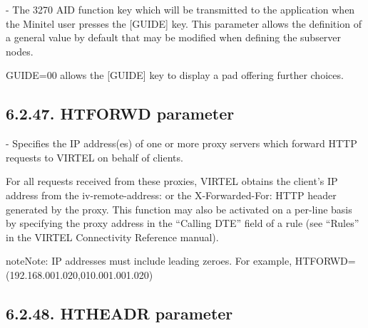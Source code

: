 \documentclass[letterpaper,10pt,english]{sphinxmanual}
\begin{document}
 - The 3270 AID function key which will be transmitted to the application when the Minitel user presses the {[}GUIDE{]} key. This parameter allows the definition of a general value by default that may be modified when defining the subserver nodes.

GUIDE=00 allows the {[}GUIDE{]} key to display a pad offering further choices.


\subsection{6.2.47. HTFORWD parameter}
\label{\detokenize{Installation_Guide:htforwd-parameter}}
\begin{sphinxVerbatim}[commandchars=\\\{\}]
        
\end{sphinxVerbatim}

 - Specifies the IP address(es) of one or more proxy servers which forward HTTP requests to VIRTEL on behalf of clients.

For all requests received from these proxies, VIRTEL obtains the client’s IP address from the iv-remote-address: or the X-Forwarded-For: HTTP header generated by the proxy. This function may also be activated on a per-line basis by specifying the proxy address in the “Calling DTE” field of a rule (see “Rules” in the VIRTEL Connectivity Reference manual).

\begin{sphinxadmonition}{note}{Note:}
IP addresses must include leading zeroes. For example, HTFORWD=(192.168.001.020,010.001.001.020)
\end{sphinxadmonition}


\subsection{6.2.48. HTHEADR parameter}
\label{\detokenize{Installation_Guide:htheadr-parameter}}
\begin{sphinxVerbatim}[commandchars=\\\{\}]
                
\end{sphinxVerbatim}
\end{document}
